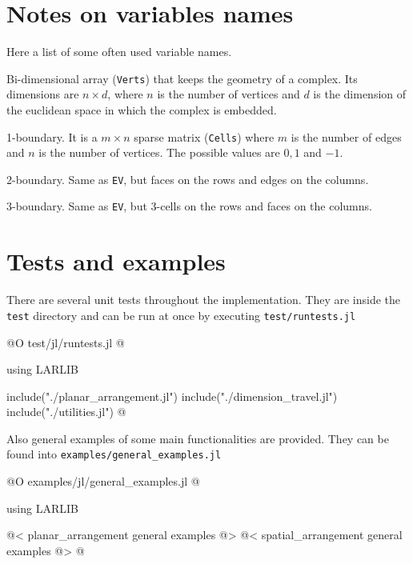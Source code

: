 \section{Notes on variables names}

Here a list of some often used variable names.

\begin{description}[align=right,labelwidth=2em]
    \item [\texttt{V}:]
        Bi-dimensional array (\texttt{Verts}) that keeps the geometry of a complex.
        Its dimensions are $n \times d$, where $n$ is the number of vertices and $d$ is the dimension
        of the euclidean space in which the complex is embedded.
    \item [\texttt{EV}:]
        1-boundary. It is a $m \times n$ sparse matrix (\texttt{Cells}) 
        where $m$ is the number of edges and $n$ is the number of vertices. The possible values
        are $0, 1$ and $-1$.
    \item [\texttt{FE}:]
        2-boundary. Same as \texttt{EV}, but faces on the rows and edges on the columns.
    \item [\texttt{CF}:]
        3-boundary. Same as \texttt{EV}, but 3-cells on the rows and faces on the columns.
\end{description}

\section{Tests and examples}

There are several unit tests throughout the implementation. They
are inside the \texttt{test} directory and can be run at once
by executing \texttt{test/runtests.jl}

@O test/jl/runtests.jl
@{using LARLIB

include("./planar_arrangement.jl")
include("./dimension_travel.jl")
include("./utilities.jl")
@}

Also general examples of some main functionalities are provided.
They can be found into \texttt{examples/general\_examples.jl}

@O examples/jl/general_examples.jl
@{using LARLIB

@< planar\_arrangement general examples @>
@< spatial\_arrangement general examples @>
@}
